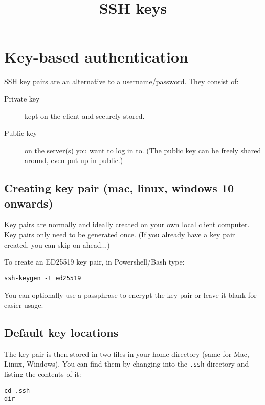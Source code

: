 \documentclass[slides]{pgnotes}
\title{SSH keys}
\begin{document}
\maketitle

\section{Key-based authentication}
\label{key-based-authentication}

SSH key pairs are an alternative to a username/password.
They consist of:

\begin{description}
\item[Private key]
kept on the client and securely stored.
\item[Public key]
on the server(s) you want to log in to. (The public key can be freely
shared around, even put up in public.)
\end{description}



\subsection{Creating key pair (mac, linux, windows 10 onwards)}
\label{sec:creating-key-pair-unix}

Key pairs are normally and ideally created on your own local client computer.
Key pairs only need to be generated once.
(If you already have a key pair created, you can skip on ahead...)

To create an ED25519 key pair, in Powershell/Bash type:

\begin{verbatim}
ssh-keygen -t ed25519
\end{verbatim}

You can optionally use a passphrase to encrypt the key pair or leave it blank for easier usage.

\subsection{Default key locations}

The key pair is then stored in two files in your home directory (same for Mac, Linux, Windows).
You can find them by changing into the \texttt{.ssh} directory and listing the contents of it:

\begin{verbatim}
cd .ssh
dir
\end{verbatim}
\end{document}
